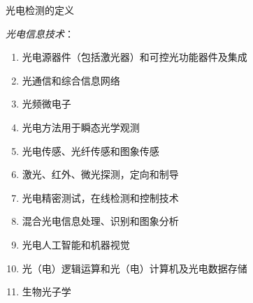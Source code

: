 \documentclass[10pt]{beamer}
\begin{document}
\begin{frame}{光电检测的定义}

    \emph{光电信息技术}：
    \begin{enumerate}[(1)]
        \item<2-| alert@2> 光电源器件（包括激光器）和可控光功能器件及集成
        \item<2-| alert@3> 光通信和综合信息网络
        \item<2-| alert@4> 光频微电子
        \item<2-| alert@5> 光电方法用于瞬态光学观测
        \item<2-| alert@6> \alert{光电传感、光纤传感和图象传感}
        \item<2-| alert@7> \alert{激光、红外、微光探测，定向和制导}
        \item<2-| alert@8> \alert{光电精密测试，在线检测和控制技术}
        \item<2-| alert@9> 混合光电信息处理、识别和图象分析
        \item<2-| alert@10> 光电人工智能和机器视觉
        \item<2-| alert@11> 光（电）逻辑运算和光（电）计算机及光电数据存储
        \item<2-| alert@12> 生物光子学
    \end{enumerate}
\end{frame}
\end{document}
